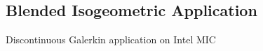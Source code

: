 \subsection{Blended Isogeometric Application}
\label{sec:isogeometric}

Discontinuous Galerkin application on Intel MIC